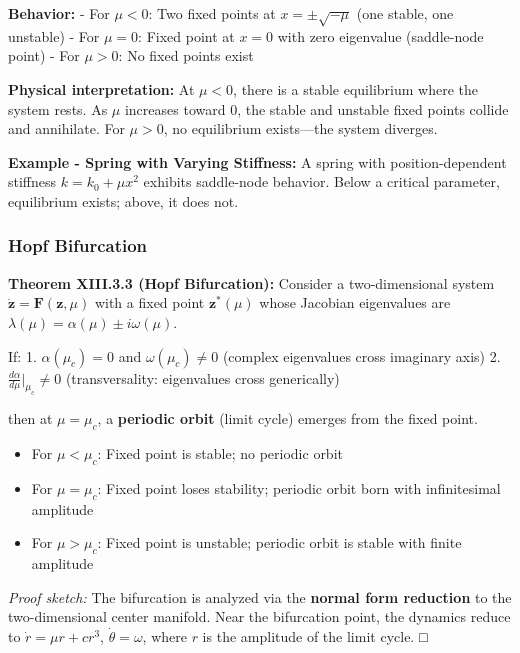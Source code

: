 \documentclass[
]{article}
\providecommand{\tightlist}{%
  \setlength{\itemsep}{0pt}\setlength{\parskip}{0pt}}
\begin{document}
\textbf{Behavior:} - For \(\mu < 0\): Two fixed points at
\(x = \pm\sqrt{-\mu}\) (one stable, one unstable) - For \(\mu = 0\):
Fixed point at \(x = 0\) with zero eigenvalue (saddle-node point) - For
\(\mu > 0\): No fixed points exist

\textbf{Physical interpretation:} At \(\mu < 0\), there is a stable
equilibrium where the system rests. As \(\mu\) increases toward 0, the
stable and unstable fixed points collide and annihilate. For
\(\mu > 0\), no equilibrium exists---the system diverges.

\textbf{Example - Spring with Varying Stiffness:} A spring with
position-dependent stiffness \(k = k_0 + \mu x^2\) exhibits saddle-node
behavior. Below a critical parameter, equilibrium exists; above, it does
not.

\subsubsection{Hopf Bifurcation}\label{hopf-bifurcation}

\textbf{Theorem XIII.3.3 (Hopf Bifurcation):} Consider a two-dimensional
system \(\dot{\mathbf{z}} = \mathbf{F}(\mathbf{z}, \mu)\) with a fixed
point \(\mathbf{z}^*(\mu)\) whose Jacobian eigenvalues are
\(\lambda(\mu) = \alpha(\mu) \pm i\omega(\mu)\).

If: 1. \(\alpha(\mu_c) = 0\) and \(\omega(\mu_c) \neq 0\) (complex
eigenvalues cross imaginary axis) 2.
\(\frac{d\alpha}{d\mu}|_{\mu_c} \neq 0\) (transversality: eigenvalues
cross generically)

then at \(\mu = \mu_c\), a \textbf{periodic orbit} (limit cycle) emerges
from the fixed point.

\begin{itemize}
\tightlist
\item
  For \(\mu < \mu_c\): Fixed point is stable; no periodic orbit
\item
  For \(\mu = \mu_c\): Fixed point loses stability; periodic orbit born
  with infinitesimal amplitude
\item
  For \(\mu > \mu_c\): Fixed point is unstable; periodic orbit is stable
  with finite amplitude
\end{itemize}

\emph{Proof sketch:} The bifurcation is analyzed via the \textbf{normal
form reduction} to the two-dimensional center manifold. Near the
bifurcation point, the dynamics reduce to \(\dot{r} = \mu r + cr^3\),
\(\dot{\theta} = \omega\), where \(r\) is the amplitude of the limit
cycle. □
\end{document}
